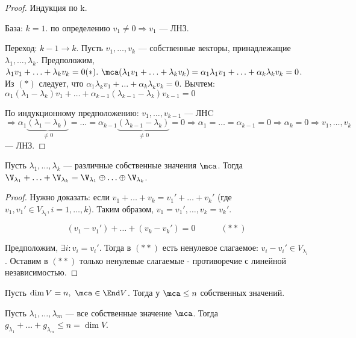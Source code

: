 \documentclass[main]{subfiles}
\begin{document}
\begin{proof}
    Индукция по k.

    База: $k = 1$.  по определению $v_1 \neq 0 \Rightarrow v_1$ — ЛНЗ.

    Переход: $k-1 \rightarrow k$. Пусть $v_1, \ldots, v_k$  — собственные 
    векторы, принадлежащие $\lambda_1, \ldots, \lambda_k$.
    Предположим, $\lambda_1 v_1 + \ldots + \lambda_k v_k = 0 (*).\
    \mca(\lambda_1 v_1 + \ldots + \lambda_k v_k) = 
    \alpha_1 \lambda_1 v_1 + \ldots + \alpha_k \lambda_k v_k = 0$. Из $(*)$ следует, что
    $\alpha_1 \lambda_k v_1 + \ldots + \alpha_k \lambda_k v_k = 0$. 
    Вычтем: $\alpha_1(\lambda_1 - \lambda_k)v_1 + \ldots + \alpha_{k-1}(\lambda_{k-1} - \lambda_k)v_{k-1} = 0$

    По индукционному предположению: $v_1, \ldots, v_{k-1}$ — ЛНC
    $\Rightarrow \alpha_1\underbrace{(\lambda_1 - \lambda_k)}_{\neq 0} = \ldots = 
    \alpha_{k-1}\underbrace{(\lambda_{k-1} - \lambda_k)}_{\neq 0} = 0 \Rightarrow
    \alpha_1 = \ldots = \alpha_{k-1} = 0 \Rightarrow \alpha_k = 0 \Rightarrow
    v_1, \ldots, v_k$ — ЛНЗ.
\end{proof}

\begin{corollary}
    Пусть $\lambda_1, \ldots, \lambda_k$ — различные собственные значения $\mca$.
    Тогда   $\V_{\lambda_1} + \ldots + \V_{\lambda_k} =
    \V_{\lambda_1} \oplus \ldots \oplus  \V_{\lambda_k}$.
\end{corollary}

\begin{proof}
    Нужно доказать: если $v_1 + \ldots + v_k = v_1' + \ldots + v_k'$
    (где $v_1, v_1' \in V_{\lambda_i}, i = 1, \ldots, k$). 
    Таким образом, $v_1 = v_1', \ldots, v_k = v_k'$. 
    
        \[(v_1 - v_1') + \ldots + (v_k - v_k') = 0 \quad \quad \quad (**)\]
    
    Предположим, $\exists i : v_i = v_i'$. Тогда в $(**)$  есть ненулевое слагаемое:
    $v_i - v_i' \in V_{\lambda_i}$. Оставим в $(**)$ только ненулевые 
    слагаемые  - противоречие с линейной независимостью.
\end{proof}

\begin{corollary}
    Пусть $\dim V = n,\ \mca \in \End V$. Тогда у  $\mca \le n$ собственных значений.
\end{corollary}

\begin{corollary}
    Пусть $\lambda_1, \ldots, \lambda_m$ — все собственные значение $\mca$. 
    Тогда $g_{\lambda_1} + \ldots + g_{\lambda_m} \le n = \dim V$.
\end{corollary}
\end{document}

